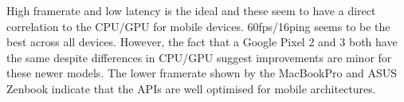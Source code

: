 \documentclass[acmlarge,screen,dvipsnames]{acmart}
\begin{document}
High framerate and low latency is the ideal and these seem to have a direct
correlation to the CPU/GPU for mobile devices. 60fps/16ping seems to be the
best across all devices. However, the fact that a Google Pixel 2 and 3 both
have the same despite differences in CPU/GPU suggest improvements are minor
for these newer models. The lower framerate shown by the MacBookPro
and ASUS Zenbook indicate that the APIs are well optimised for mobile
architectures.






\end{document}
